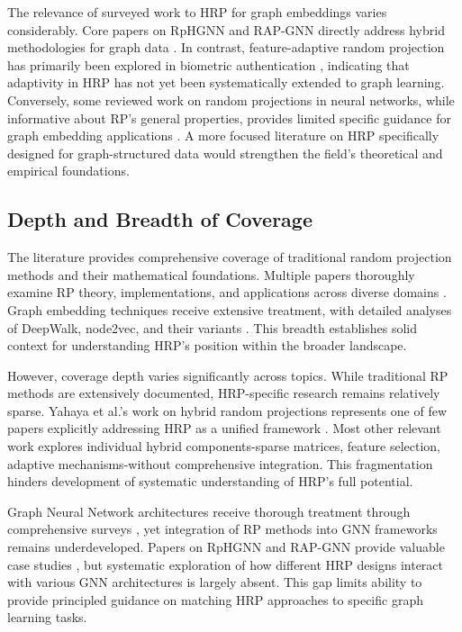 \documentclass[conference]{IEEEtran}
\begin{document}
The relevance of surveyed work to HRP for graph embeddings varies considerably. Core papers on RpHGNN and RAP-GNN directly address hybrid methodologies for graph data \cite{hu2021rphgnn, bui2023rap}. In contrast, feature-adaptive random projection has primarily been explored in biometric authentication \cite{yang2021cancelable}, indicating that adaptivity in HRP has not yet been systematically extended to graph learning.
Conversely, some reviewed work on random projections in neural networks, while informative about RP's general properties, provides limited specific guidance for graph embedding applications \cite{andras2018, cai2019enhanced}. A more focused literature on HRP specifically designed for graph-structured data would strengthen the field's theoretical and empirical foundations.

\subsection{Depth and Breadth of Coverage}

The literature provides comprehensive coverage of traditional random projection methods and their mathematical foundations. Multiple papers thoroughly examine RP theory, implementations, and applications across diverse domains \cite{xie2018survey, siddharth2017randpro}. Graph embedding techniques receive extensive treatment, with detailed analyses of DeepWalk, node2vec, and their variants \cite{perozzi2014, xie2017survey}. This breadth establishes solid context for understanding HRP's position within the broader landscape.

However, coverage depth varies significantly across topics. While traditional RP methods are extensively documented, HRP-specific research remains relatively sparse. Yahaya et al.'s work on hybrid random projections represents one of few papers explicitly addressing HRP as a unified framework \cite{yahaya2025hrp}. Most other relevant work explores individual hybrid components-sparse matrices, feature selection, adaptive mechanisms-without comprehensive integration. This fragmentation hinders development of systematic understanding of HRP's full potential.

Graph Neural Network architectures receive thorough treatment through comprehensive surveys \cite{khemani2024, gkarmpounis2024}, yet integration of RP methods into GNN frameworks remains underdeveloped. Papers on RpHGNN and RAP-GNN provide valuable case studies \cite{hu2021rphgnn, bui2023rap}, but systematic exploration of how different HRP designs interact with various GNN architectures is largely absent. This gap limits ability to provide principled guidance on matching HRP approaches to specific graph learning tasks.
\end{document}
